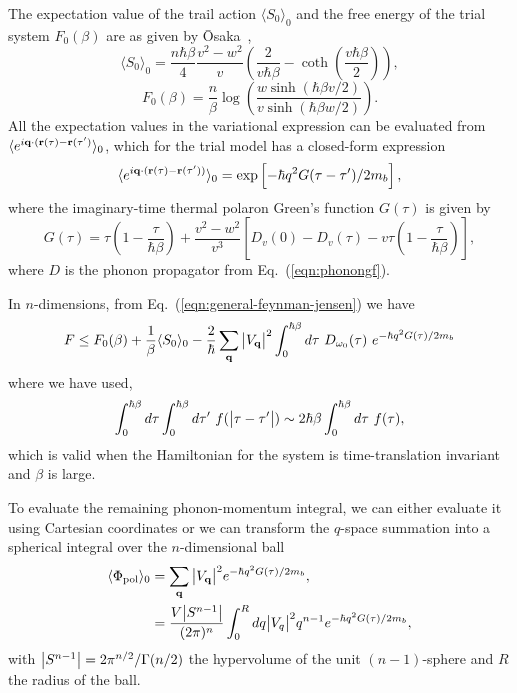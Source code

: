 The expectation value of the trail action $\langle S_0 \rangle_0$ and the free energy of the trial system $F_0(\beta) $ are as given by \=Osaka~\cite{osaka_polaron_1959},
\begin{equation}
    \langle S_0 \rangle_0 = \frac{n\hbar\beta}{4} \frac{v^2-w^2}{v} \left(\frac{2}{v\hbar\beta} - \coth\left(\frac{v\hbar\beta}{2}\right)\right) ,
\end{equation}
\begin{equation}
    F_0(\beta) = \frac{n}{\beta} \log\left(\frac{w \sinh(\hbar\beta v / 2)}{v \sinh(\hbar\beta w / 2)}\right).
\end{equation}
All the expectation values in the variational expression can be evaluated from
$\langle e^{i \vb{q} \cdot (\vb{r}(\tau) - \vb{r}(\tau')} \rangle_0$, which for the trial model has a closed-form expression 
\begin{equation}
    \langle e^{i \vb{q} \cdot (\vb{r}(\tau) - \vb{r}(\tau'))} \rangle_0 = \exp\left[-\hbar q^2 G(\tau - \tau') / 2 m_b \right] ,
\end{equation}
where the imaginary-time thermal polaron Green's function $G(\tau)$ is given by
\begin{equation} \label{eqn:polarongreensfunc}
    G(\tau) = \tau \left(1 - \frac{\tau}{\hbar\beta}\right) + \frac{v^2 - w^2}{v^3} \left[ D_v(0) - D_v(\tau) - v \tau \left(1 - \frac{\tau}{\hbar\beta} \right) \right],
\end{equation}
where $D$ is the phonon propagator from Eq.~(\ref{eqn:phonongf}).

In $n$-dimensions, from Eq.~(\ref{eqn:general-feynman-jensen}) we have 
\begin{equation}\label{eqn:generalfreeenergy}
        F \leq F_0(\beta) + \frac{1}{\beta} \langle S_0 \rangle_{0} - \frac{2}{\hbar} \sum_{\vb{q}} \abs{V_{\vb{q}}}^2 \int_0^{\hbar\beta} d\tau\ D_{\omega_0}(\tau)\ e^{-\hbar q^2 G(\tau) / 2 m_b}
\end{equation}
where we have used,
\begin{equation}
    \int_0^{\hbar\beta} d\tau \int_0^{\hbar\beta} d\tau'\ f(\abs{\tau - \tau'}) \sim 2\hbar\beta \int_0^{\hbar\beta}d\tau\ f(\tau),
\end{equation}
which is valid when the Hamiltonian for the system is time-translation invariant and $\beta$ is large.

To evaluate the remaining phonon-momentum integral, we can either evaluate it using Cartesian coordinates or we can transform the $q$-space summation into a spherical integral
over the $n$-dimensional ball 
\begin{equation} \label{eqn:general_self_interaction}
    \begin{aligned}
        \langle \Phi_{\text{pol}}\rangle_0 &= \sum_{\vb{q}} \abs{V_{\vb{q}}}^2 e^{-\hbar q^2 G(\tau) / 2 m_b} , \\
        &= \frac{V \abs{S^{n-1}}}{(2\pi)^n} \int_0^R dq \abs{V_q}^2 q^{n-1} e^{-\hbar q^2 G(\tau) / 2 m_b} ,
    \end{aligned}
\end{equation}
with $\abs{S^{n-1}} = 2\pi^{n/2}/\Gamma(n/2)$ the hypervolume of the unit $(n-1)$-sphere and $R$ the radius of the ball. 


